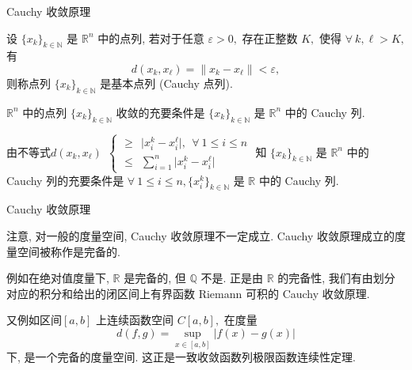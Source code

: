 
\begin{frame}{Cauchy 收敛原理}

\begin{Def}
设 $\{x_k\}_{k\in\mathbb{N}}$ 是 $\mathbb{R}^n$ 中的点列, 若对于任意 $\varepsilon > 0,$ 存在正整数 $K,$ 使得 $\forall~k, \ell > K,$ 有
\[d(x_k, x_\ell) = \lVert x_k - x_\ell \rVert < \varepsilon,\]
则称点列 $\{x_k\}_{k\in\mathbb{N}}$ 是基本点列 (Cauchy 点列).
\end{Def}

\pause

\begin{thm}
$\mathbb{R}^n$ 中的点列 $\{x_k\}_{k\in\mathbb{N}}$ 收敛的充要条件是 $\{x_k\}_{k\in\mathbb{N}}$ 是 $\mathbb{R}^n$ 中的 Cauchy 列.
\end{thm}

\pause

由不等式$
d(x_k, x_\ell) ~~ \begin{cases}
\geqslant ~~ \lvert x_i^k - x_i^\ell \rvert, ~~ \forall~1 \leqslant i \leqslant n \\
\leqslant ~~ \sum\limits_{i=1}^n \lvert x_i^k - x_i^\ell \rvert
\end{cases}
$
知 $\{x_k\}_{k\in\mathbb{N}}$ 是 $\mathbb{R}^n$ 中的 Cauchy 列的充要条件是 $\forall~1 \leqslant i \leqslant n, \{x_i^k\}_{k\in\mathbb{N}}$ 是 $\mathbb{R}$ 中的 Cauchy 列.

\end{frame}


\begin{frame}{Cauchy 收敛原理}

{\color{red}注意}, 对一般的度量空间, Cauchy 收敛原理不一定成立. Cauchy 收敛原理成立的度量空间被称作是完备的.

\vspace{1em}

例如在绝对值度量下, $\mathbb{R}$ 是完备的, 但 $\mathbb{Q}$ 不是.
\pause
正是由 $\mathbb{R}$ 的完备性, 我们有由划分对应的积分和给出的闭区间上有界函数 Riemann 可积的 Cauchy 收敛原理.

\pause
\vspace{1em}

又例如区间$[a, b]$ 上连续函数空间 $C[a, b],$ 在度量
\[d(f, g) = \sup\limits_{x \in [a, b]} \lvert f(x) - g(x) \rvert\]
下, 是一个完备的度量空间. 这正是一致收敛函数列极限函数连续性定理.

\end{frame}

